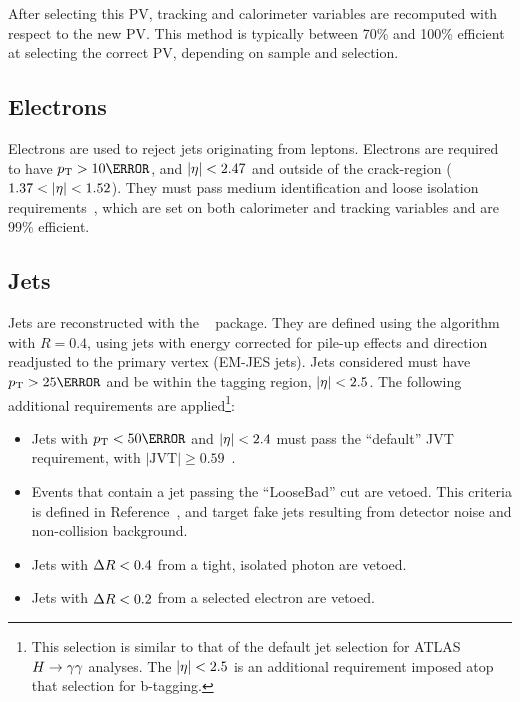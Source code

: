 After selecting this \gls{PV}, tracking and calorimeter variables are recomputed with respect to the new \gls{PV}. This method is typically between 70\% and 100\% efficient at selecting the correct \gls{PV}, depending on sample and selection.


\subsection{Electrons}

Electrons are used to reject jets originating from leptons. Electrons are required to have $\pt > \unit{10}{\GeV}$, and $|\eta| < 2.47$ and outside of the crack-region ($1.37 < |\eta| < 1.52$). They must pass medium identification and loose isolation requirements~\cite{electron-efficiency}, which are set on both calorimeter and tracking variables and are 99\% efficient.

\subsection{Jets}

Jets are reconstructed with the ~\cite{fastjet} package. They are defined using the \antikt algorithm with $R=0.4$, using jets with energy corrected for pile-up effects and direction readjusted to the primary vertex (EM-JES jets). Jets considered must have $\pt > \unit{25}{\GeV}$ and be within the tagging region, $|\eta| < 2.5$. The following additional requirements are applied\footnote{This selection is similar to that of the default jet selection for ATLAS $H\rightarrow \gamma\gamma$ analyses. The $|\eta| < 2.5$ is an additional requirement imposed atop that selection for b-tagging.}:

\begin{itemize}
  \item Jets with $\pt < \unit{50}{\GeV}$ and $|\eta| < 2.4$ must pass the ``default'' \gls{JVT} requirement, with $|\text{JVT}| \geq 0.59$~\cite{JVT}.
  \item Events that contain a jet passing the ``LooseBad'' cut are vetoed. This criteria is defined in Reference~\cite{loosebad}, and target fake jets resulting from detector noise and non-collision background. 
  \item Jets with $\Delta R < 0.4$ from a tight, isolated photon are vetoed.
  \item Jets with $\Delta R < 0.2$ from a selected electron are vetoed.
\end{itemize}


